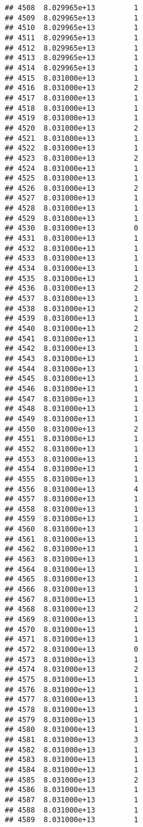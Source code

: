 \documentclass[
]{article}
\begin{document}
\begin{verbatim}
## 4508  8.029965e+13         1
## 4509  8.029965e+13         1
## 4510  8.029965e+13         1
## 4511  8.029965e+13         1
## 4512  8.029965e+13         1
## 4513  8.029965e+13         1
## 4514  8.029965e+13         1
## 4515  8.031000e+13         1
## 4516  8.031000e+13         2
## 4517  8.031000e+13         1
## 4518  8.031000e+13         1
## 4519  8.031000e+13         1
## 4520  8.031000e+13         2
## 4521  8.031000e+13         1
## 4522  8.031000e+13         1
## 4523  8.031000e+13         2
## 4524  8.031000e+13         1
## 4525  8.031000e+13         1
## 4526  8.031000e+13         2
## 4527  8.031000e+13         1
## 4528  8.031000e+13         1
## 4529  8.031000e+13         1
## 4530  8.031000e+13         0
## 4531  8.031000e+13         1
## 4532  8.031000e+13         1
## 4533  8.031000e+13         1
## 4534  8.031000e+13         1
## 4535  8.031000e+13         1
## 4536  8.031000e+13         2
## 4537  8.031000e+13         1
## 4538  8.031000e+13         2
## 4539  8.031000e+13         1
## 4540  8.031000e+13         2
## 4541  8.031000e+13         1
## 4542  8.031000e+13         1
## 4543  8.031000e+13         1
## 4544  8.031000e+13         1
## 4545  8.031000e+13         1
## 4546  8.031000e+13         1
## 4547  8.031000e+13         1
## 4548  8.031000e+13         1
## 4549  8.031000e+13         1
## 4550  8.031000e+13         2
## 4551  8.031000e+13         1
## 4552  8.031000e+13         1
## 4553  8.031000e+13         1
## 4554  8.031000e+13         1
## 4555  8.031000e+13         1
## 4556  8.031000e+13         4
## 4557  8.031000e+13         1
## 4558  8.031000e+13         1
## 4559  8.031000e+13         1
## 4560  8.031000e+13         1
## 4561  8.031000e+13         1
## 4562  8.031000e+13         1
## 4563  8.031000e+13         1
## 4564  8.031000e+13         1
## 4565  8.031000e+13         1
## 4566  8.031000e+13         1
## 4567  8.031000e+13         1
## 4568  8.031000e+13         2
## 4569  8.031000e+13         1
## 4570  8.031000e+13         1
## 4571  8.031000e+13         1
## 4572  8.031000e+13         0
## 4573  8.031000e+13         1
## 4574  8.031000e+13         2
## 4575  8.031000e+13         1
## 4576  8.031000e+13         1
## 4577  8.031000e+13         1
## 4578  8.031000e+13         1
## 4579  8.031000e+13         1
## 4580  8.031000e+13         1
## 4581  8.031000e+13         3
## 4582  8.031000e+13         1
## 4583  8.031000e+13         1
## 4584  8.031000e+13         1
## 4585  8.031000e+13         2
## 4586  8.031000e+13         1
## 4587  8.031000e+13         1
## 4588  8.031000e+13         1
## 4589  8.031000e+13         1

\end{verbatim}
\end{document}
